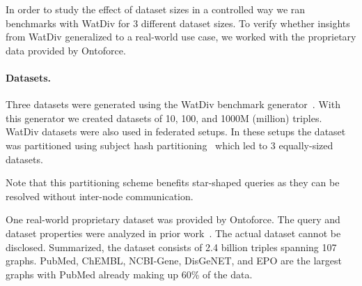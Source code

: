 In order to study the effect of dataset sizes in a controlled way we ran benchmarks with WatDiv for 3 different dataset sizes. To verify
whether insights from WatDiv generalized to a real-world use case, we worked with the proprietary data provided by Ontoforce.

\paragraph{Datasets.} 
Three datasets were generated using the WatDiv benchmark generator~\cite{alucc2014diversified}. 
With this generator we created datasets of 10, 100, and 1000M (million) triples. 
WatDiv datasets were also used in federated setups. 
In these setups the dataset was partitioned using subject hash partitioning~\cite{Zeng, Harth} which led to 3 equally-sized datasets.

Note that this partitioning scheme benefits star-shaped queries as they can be resolved without inter-node communication.

One real-world proprietary dataset was provided by Ontoforce. 
The query and dataset properties were analyzed in prior work~\cite{dewitte_swat4ls_2016}. The actual dataset cannot be disclosed. 
Summarized, the dataset consists of 2.4 billion triples spanning 107 graphs. 
PubMed, ChEMBL, NCBI-Gene, DisGeNET, and EPO are the largest graphs with PubMed already making up 60\% of the data.

